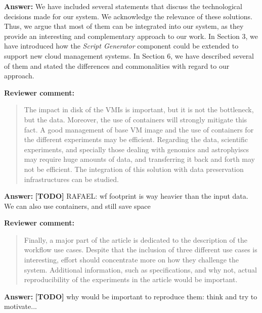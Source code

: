 \documentclass{letter}
\newenvironment{review}%
{\textbf{Reviewer comment:}\begin{quote}}%
{\end{quote}}%
\newcommand{\todo}[1]{%
      \color{red}\textbf{[TODO]} #1\color{black}}
\newcommand{\answer}[1]{%
      \textbf{Answer:} #1}
\begin{document}
\begin{letter}{}
\answer{We have included several statements that discuss the technological decisions made for our system. We acknowledge the relevance of these solutions. Thus, we argue that most of them can be integrated into our system, as they provide an interesting and complementary approach to our work. In Section 3, we have introduced how the {\it Script Generator} component could be extended to support new cloud management systems. In Section 6, we have described several of them and stated the differences and commonalities with regard to our approach.}


\begin{review}
The impact in disk of the VMIs is important, but it is not the bottleneck, but the data. Moreover, the use of containers will strongly mitigate this fact. A good management of base VM image and the use of containers for the different experiments may be efficient. Regarding the data, scientific experiments, and specially those dealing with genomics and astrophyiscs may require huge amounts of data, and transferring it back and forth may not be efficient. The integration of this solution with data preservation infrastructures can be studied.
\end{review}

\answer{\todo{RAFAEL: wf footprint is way heavier than the input data. We can also use containers, and still save space}}


\begin{review}
Finally, a major part of the article is dedicated to the description of the workflow use cases. Despite that the inclusion of three different use cases is interesting, effort should concentrate more on how they challenge the system. Additional information, such as specifications, and why not, actual reproducibility of the experiments in the article would be important.
\end{review}

\answer{\todo{why would be important to reproduce them: think and try to motivate...}}


\end{letter}
\end{document}
